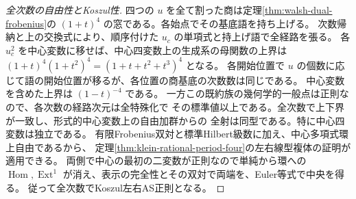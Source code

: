\begin{proof}[全次数の自由性とKoszul性]
四つの $u$ を全て割った商は定理\ref{thm:walsh-dual-frobenius}の
$(1+t)^4$ の窓である。各始点でその基底語を持ち上げる。
次数帰納と上の交換式により、順序付けた $u_c$ の単項式と持上げ語で全経路を張る。
各 $u_c^2$ を中心変数に移せば、中心四変数上の生成系の母関数の上界は
$(1+t)^4(1+t^2)^4=(1+t+t^2+t^3)^4$ となる。
各開始位置で $u$ の個数に応じて語の開始位置が移るが、各位置の商基底の次数数は同じである。
中心変数を含めた上界は $(1-t)^{-4}$ である。
一方この既約族の幾何学的一般点は正則なので、各次数の経路次元は全特殊化で
その標準値以上である。全次数で上下界が一致し、形式的中心変数上の自由加群からの
全射は同型である。特に中心四変数は独立である。
有限Frobenius双対と標準Hilbert級数に加え、中心多項式環上自由であるから、
定理\ref{thm:klein-rational-period-four}の左右線型複体の証明が適用できる。
両側で中心の最初の二変数が正則なので単純から環への $\operatorname{Hom},\operatorname{Ext}^1$
が消え、表示の完全性とその双対で両端を、Euler等式で中央を得る。
従って全次数でKoszul左右AS正則となる。
\end{proof}

